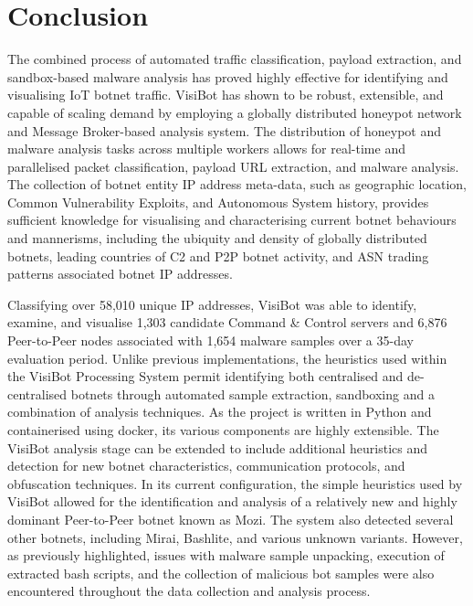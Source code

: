 
\chapter{Conclusion}

The combined process of automated traffic classification, payload extraction, and sandbox-based malware analysis has proved highly effective for identifying and visualising IoT botnet traffic. VisiBot has shown to be robust, extensible, and capable of scaling demand by employing a globally distributed honeypot network and Message Broker-based analysis system. The distribution of honeypot and malware analysis tasks across multiple workers allows for real-time and parallelised packet classification, payload URL extraction, and malware analysis. The collection of botnet entity IP address meta-data, such as geographic location, Common Vulnerability Exploits, and Autonomous System history, provides sufficient knowledge for visualising and characterising current botnet behaviours and mannerisms, including the ubiquity and density of globally distributed botnets, leading countries of C2 and P2P botnet activity, and ASN trading patterns associated botnet IP addresses.

Classifying over 58,010 unique IP addresses, VisiBot was able to identify, examine, and visualise 1,303 candidate Command \& Control servers and 6,876 Peer-to-Peer nodes associated with 1,654 malware samples over a 35-day evaluation period. Unlike previous implementations, the heuristics used within the VisiBot Processing System permit identifying both centralised and de-centralised botnets through automated sample extraction, sandboxing and a combination of analysis techniques. As the project is written in Python and containerised using docker, its various components are highly extensible. The VisiBot analysis stage can be extended to include additional heuristics and detection for new botnet characteristics, communication protocols, and obfuscation techniques. In its current configuration, the simple heuristics used by VisiBot allowed for the identification and analysis of a relatively new and highly dominant Peer-to-Peer botnet known as Mozi. The system also detected several other botnets, including Mirai, Bashlite, and various unknown variants. However, as previously highlighted, issues with malware sample unpacking, execution of extracted bash scripts, and the collection of malicious bot samples were also encountered throughout the data collection and analysis process.

